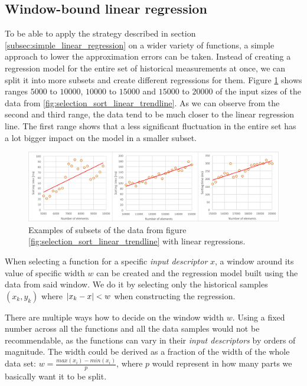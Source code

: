 \subsection{Window-bound linear regression}
\label{subsec:window_bound_regression}

To be able to apply the strategy described in section \ref{subsec:simple_linear_regression} on a wider variety of functions, a simple approach to lower the approximation errors can be taken. Instead of creating a regression model for the entire set of historical measurements at once, we can split it into more subsets and create different regressions for them. Figure \ref{fig:window_examples} shows ranges $5000$ to $10000$, $10000$ to $15000$ and $15000$ to $20000$ of the input sizes of the data from \ref{fig:selection_sort_linear_trendline}. As we can observe from the second and third range, the data tend to be much closer to the linear regression line. The first range shows that a less significant fluctuation in the entire set has a lot bigger impact on the model in a smaller subset.

\begin{figure}[h!]
	\captionsetup{justification=centering,margin=0.5cm}
	\centerline{\mbox{\includegraphics[width=150mm]{./img/window_examples.png}}}
	\caption{Examples of subsets of the data from figure \ref{fig:selection_sort_linear_trendline} with linear regressions.}
	\label{fig:window_examples}
\end{figure}

When selecting a function for a specific \textit{input descriptor} $x$, a window around its value of specific width $w$ can be created and the regression model built using the data from said window. We do it by selecting only the historical samples $(x_k, y_k)$ where $\left|{x_k - x}\right| < w$ when constructing the regression.

There are multiple ways how to decide on the window width $w$. Using a fixed number across all the functions and all the data samples would not be recommendable, as the functions can vary in their \textit{input descriptors} by orders of magnitude. The width could be derived as a fraction of the width of the whole data set: $w = \frac{max(x_i) - min(x_i)}{p}$, where $p$ would represent in how many parts we basically want it to be split. 

